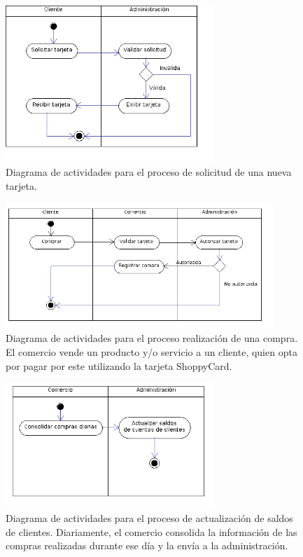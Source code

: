 \begin{figure}[htb]
\begin{center}
\includegraphics[width=0.7\textwidth]{images/mod_negocio_act_solicitudtarjeta.png}
\end{center}
\caption{Diagrama de actividades para el proceso de solicitud de una nueva tarjeta.}
\end{figure}

\begin{figure}[htb]
\begin{center}
\includegraphics[width=0.9\textwidth]{images/mod_negocio_act_compra.png}
\end{center}
\caption{Diagrama de actividades para el proceso realización de una compra. El comercio vende un producto y/o servicio a un cliente, quien opta por pagar por este utilizando la tarjeta ShoppyCard.}
\end{figure}

\begin{figure}[htb]
\begin{center}
\includegraphics[width=0.7\textwidth]{images/mod_negocio_act_regcompras.png}
\end{center}
\caption{Diagrama de actividades para el proceso de actualización de saldos de clientes. Diariamente, el comercio consolida la información de las compras realizadas durante ese día y la envía a la administración.}
\end{figure}

